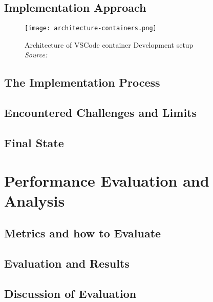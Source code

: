 \documentclass[12pt, a4paper]{article}
\begin{document}
    \subsection{Implementation Approach}\label{ssec::imp_approach}
    \begin{figure}[]
        \centering
        \texttt{[image: architecture-containers.png]}
        \caption{Architecture of \ac{VSCode} container Development setup \\\textit{Source:~\cite{vscodedevcontainer}}}\label{fig::vscodecontainer}
    \end{figure}

    \subsection{The Implementation Process}\label{ssec::imp_process}
    \subsection{Encountered Challenges and Limits}
    \subsection{Final State}\label{sec::final}


\section{Performance Evaluation and Analysis}\label{sec::eval}
    \subsection{Metrics and how to Evaluate}
    \subsection{Evaluation and Results}
    \subsection{Discussion of Evaluation}
\end{document}
